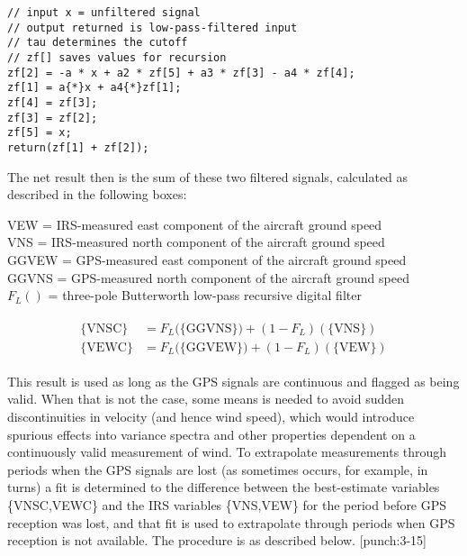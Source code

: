 \documentclass[
  english,
]{book}
\begin{document}
\begin{verbatim}
// input x = unfiltered signal  
// output returned is low-pass-filtered input  
// tau determines the cutoff  
// zf[] saves values for recursion  
zf[2] = -a * x + a2 * zf[5] + a3 * zf[3] - a4 * zf[4];  
zf[1] = a{*}x + a4{*}zf[1];     
zf[4] = zf[3];  
zf[3] = zf[2];  
zf[5] = x;  
return(zf[1] + zf[2]); 
\end{verbatim}

The net result then is the sum of these two filtered signals, calculated as described in the following boxes:

VEW = IRS-measured east component
of the aircraft ground speed\\
VNS = IRS-measured north component of the aircraft ground speed\\
GGVEW = GPS-measured east component of the aircraft ground speed\\
GGVNS = GPS-measured north component of the aircraft ground speed\\
\(F_{L}()\) = three-pole Butterworth low-pass recursive digital filter

\begin{align}\begin{split}
\{\mathrm{VNSC}\} & = F_{L}(\mathrm{\{GGVNS\})}+(1-F_{L})(\{\mathrm{VNS\}})\\
\{\mathrm{VEWC}\} & = F_{L}(\mathrm{\{GGVEW\})}+(1-F_{L})(\{\mathrm{VEW\}})
\end{split}\label{eq:VC}
\end{align}

This result is used as long as the GPS signals are continuous and flagged as being valid. When that is not the case, some means is needed to avoid sudden discontinuities in velocity (and hence wind speed), which would introduce spurious effects into variance spectra and other properties dependent on a continuously valid measurement of wind. To extrapolate measurements through periods when the GPS signals are lost (as sometimes occurs, for example, in turns) a fit is determined to the difference between the best-estimate variables \{VNSC,VEWC\} and the IRS variables \{VNS,VEW\} for the period before GPS reception was lost, and that fit is used to extrapolate through periods when GPS reception is not available. The procedure is as described below.
\protect\hypertarget{punch:3-15}{}{{[}punch:3-15{]}}
\end{document}
